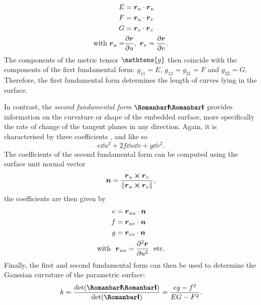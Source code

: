 \begin{equation}
    \begin{split}
        E &= \vb*{r}_u \cdot \vb*{r}_u \\
        F &= \vb*{r}_u \cdot \vb*{r}_v \\
        G &= \vb*{r}_v \cdot \vb*{r}_v \\
        \text{with }  \vb*{r}_u = & \pdv{\vb*{r}}{u},\ \vb*{r}_v = \pdv{\vb*{r}}{v}.
    \end{split}
    \label{eq:first_fform}
\end{equation}
The components of the metric tensor \(\mathtens{g}\) then coincide with the components of the first fundamental form: \(g_{11} = E\), \(g_{12} = g_{21}= F\) and \(g_{22} = G\). Therefore, the first fundamental form determines the length of curves lying in the surface.

In contrast, the \emph{second fundamental form} $\secondff$ provides information on the curvature or shape of the embedded surface, more specifically the rate of change of the tangent planes in any direction. Again, it is characterised by three coefficients ,  and  like so
\[ e\dd{u}^2 + 2f\dd{u}\dd{v} + g\dd{v}^2. \]
The coefficients of the second fundamental form can be computed using the surface unit normal vector 
\begin{equation}
    \vb*{n} =  \frac{\vb*{r}_u \cross \vb*{r}_v}{\norm{\vb*{r}_u \cross \vb*{r}_v}},
    \label{eq:unit_normal}
\end{equation}
the coefficients are then given by
\begin{equation}
    \begin{split}
        e &= \vb*{r}_{uu} \cdot \vb*{n}\\
        f &= \vb*{r}_{uv} \cdot \vb*{n}\\
        g &= \vb*{r}_{vv} \cdot \vb*{n}\\
        \text{with }\ & \vb*{r}_{uu} = \pdv[2]{\vb*{r}}{u}\ \text{ etc.}
    \end{split}
    \label{eq:second_fform}
\end{equation}
Finally, the first and second fundamental form can then be used to determine the Gaussian curvature of the parametric surface: \cite{ONeill2006, Spivak1999b}
\begin{equation}
    k = \frac{\det(\secondff)}{\det(\firstff)} = \frac{eg - f^2}{EG - F^2}.
    \label{eq:gaussian_curv}
\end{equation}

